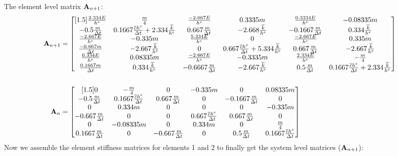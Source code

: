 The element level matrix ${\bf A}_{n+1}$:
\begin{align*}
{\bf A}_{n+1}
& =
\begin{bmatrix}[1.5]
\frac{2.334E}{h^e} & \frac{m}{4} & \frac{-2.667E}{h^e} & 0.3335m & \frac{0.3334E}{h^e} & -0.08335m \\
-0.5\frac{m}{\Delta t} & 0.1667\frac{\overline{c}h^e}{\Delta t}+2.334\frac{\overline{k}}{h^e} & 0.667\frac{m}{\Delta t} & -2.668\frac{\overline{k}}{h^e} & -0.1667\frac{m}{\Delta t} & 0.334\frac{\overline{k}}{h^e} \\
\frac{-2.667E}{h^e} & -0.335m & \frac{5.334E}{h^e} & 0 & \frac{-2.667E}{h^e} & 0.335m \\
\frac{-0.667m}{\Delta t} & -2.667\frac{\overline{k}}{h^e} & 0 & 0.667\frac{\overline{c}h^e}{\Delta t}+5.334\frac{\overline{k}}{h^e} & 0.667\frac{m}{\Delta t} & -2.667\frac{\overline{k}}{h^e} \\
\frac{0.334E}{h^e} & 0.08335m & \frac{-2.667E}{h^e} & -0.3335m & \frac{2.334E}{h^e} & -\frac{m}{4} \\ 
\frac{0.1667m}{\Delta t} & 0.334\frac{\overline{k}}{h^e} & -0.6667\frac{m}{\Delta t} & -2.667\frac{\overline{k}}{h^e} & 0.5\frac{m}{\Delta t} & 0.1667\frac{\overline{c}h^e}{\Delta t}+2.334\frac{\overline{k}}{h^e}
\end{bmatrix} \\ \\ 
{\bf A}_{n}
& =
\begin{bmatrix}[1.5]
 0 & -\frac{m}{4} & 0 & -0.335m & 0 & 0.08335m \\
 -0.5\frac{m}{\Delta t} & 0.1667\frac{\overline{c}h^e}{\Delta t} & 0.667\frac{m}{\Delta t} & 0 & -0.1667\frac{m}{\Delta t} & 0 \\
 0 & 0.334m & 0 & 0 & 0 & -0.335m \\
 -0.667\frac{m}{\Delta t} & 0 & 0 & 0.667\frac{\overline{c}h^e}{\Delta t} & 0.667\frac{m}{\Delta t} & 0 \\
 0 & -0.08335m & 0 & 0.334m & 0 & \frac{m}{4} \\
 0.1667\frac{m}{\Delta t} & 0 & -0.667\frac{m}{\Delta t} & 0 & 0.5\frac{m}{\Delta t} & 0.1667\frac{\overline{c}h^e}{\Delta t} \\
\end{bmatrix}
\end{align*}
Now we assemble the element stiffness matrices for elements 1 and 2 to finally get the system level matrices (${\bf A}_{n+1}$): 
